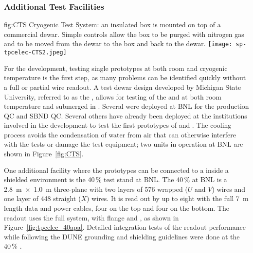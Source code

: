 {

\subsubsection{Additional Test Facilities}
\label{sec:fdsp-tpcelec-qa-facilities-additional}

\begin{dunefigure}
{fig:CTS}
{Cryogenic Test System: an insulated box is mounted on top of a commercial \lntwo dewar.  Simple controls allow the box to be purged with nitrogen gas and \lntwo to be moved from the dewar to the box and back to the dewar.}
\texttt{[image: sp-tpcelec-CTS2.jpeg]}
\end{dunefigure}

For the  development, testing single prototypes at both room and 
cryogenic temperature is the first step, as many problems can be identified 
quickly without a full or partial  wire readout. A test dewar 
design developed by Michigan State University, referred to as the , 
allows for testing of the  and  at both room 
temperature and submerged in \lntwo. Several  were deployed at 
BNL for the  production  QC and SBND  QC. 
Several others have already been deployed at the institutions involved in
the  development to test the first prototypes of 
and .  The  cooling process avoids the condensation 
of water from air that can otherwise interfere with the tests or damage the 
test equipment; two  units in operation at BNL are shown in Figure~\ref{fig:CTS}.

One additional facility where the  prototypes can be connected to
a  inside a shielded environment is the \num{40}\,\%  
test stand at BNL. The \num{40}\,\%  at BNL is a \SI{2.8}{m}~$\times$~\SI{1.0}{m} three-plane  with two 
layers of \num{576} wrapped ($U$ and $V$) wires and one layer of \num{448} straight ($X$) wires. It is read 
out by up to eight  with the full \SI{7}{m}  length data and  power cables, 
four on the top and four on the bottom. The readout uses the full  system, with  flange 
and , as shown in Figure~\ref{fig:tpcelec_40apa}. Detailed integration tests of the 
 readout performance while following the DUNE grounding and shielding guidelines were done at the 
\num{40}\,\% .

}
